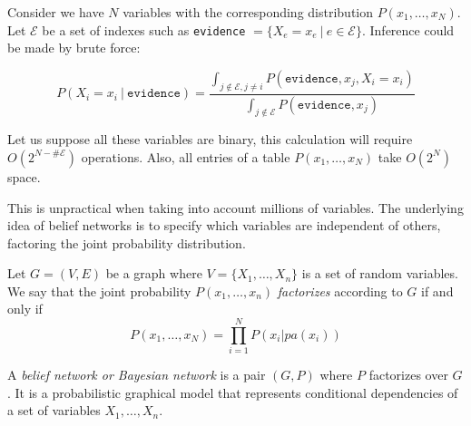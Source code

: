 Consider we have \(N\) variables with the corresponding distribution
\(P(x_1,\dots,x_N)\). Let \(\mathcal{E}\) be a set of indexes such as \texttt{evidence}
\(=\{X_e = x_e \ | \ e \in \mathcal{E}\}\). Inference could be made by brute
force:

\[
P(X_i = x_i \ | \ \texttt{evidence}) = \frac{ \int_{ j \not \in
\mathcal{E}, j \neq i } P(\texttt{evidence}, x_j, X_i = x_i)}{ \int_{ j
\not \in \mathcal{E} } P(\texttt{evidence}, x_j)}
\]

Let us suppose all these variables are binary, this calculation will require
\(O(2^{N-\#\mathcal{E}})\) operations. Also, all entries of a table \(P(x_1,\dots,
x_N)\) take \(O(2^N)\) space.

This is unpractical when taking into account millions of variables. The
underlying idea of belief networks is to specify which variables are independent
of others, factoring the joint probability distribution.

\begin{definition}
Let \(G=(V,E)\) be a graph where \(V = \{X_1,\dots,X_n\}\) is a set of random
variables. We say that the joint
probability \(P(x_1, \dots, x_n)\) \emph{factorizes} according to \(G\) if and
only if
\[
P(x_1,\dots,x_N) = \prod_{i=1}^{N}P(x_i | pa(x_i))
\]
\end{definition}

\begin{definition}
A \emph{belief network or Bayesian network} is a pair \((G, P)\)
where \(P\) factorizes over \(G\). It is a probabilistic graphical model
that represents conditional dependencies of a set of variables \(X_1,\dots, X_n\).
\end{definition}

\begin{figure}[h!]
  \centering
    \label{fig:bn_example}
\end{figure}


